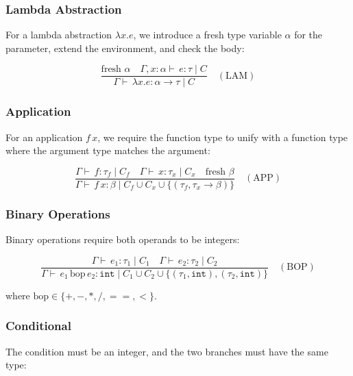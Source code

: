 \documentclass[12pt]{article}
\newcommand{\judge}[1]{\vdash \, #1}
\newcommand{\env}{\Gamma}
\newcommand{\type}{\tau}
\begin{document}
\subsubsection{Lambda Abstraction}

For a lambda abstraction $\lambda x . e$, we introduce a fresh type variable $\alpha$ for the parameter, extend the environment, and check the body:

\begin{equation*}
\frac{
  \text{fresh } \alpha
  \quad
  \env, x : \alpha \judge{e : \type \mid C}
}{
  \env \judge{\lambda x . e : \alpha \to \type \mid C}
}
\quad (\text{LAM})
\end{equation*}

\subsubsection{Application}

For an application $f \, x$, we require the function type to unify with a function type where the argument type matches the argument:

\begin{equation*}
\frac{
  \env \judge{f : \type_f \mid C_f}
  \quad
  \env \judge{x : \type_x \mid C_x}
  \quad
  \text{fresh } \beta
}{
  \env \judge{f \, x : \beta \mid C_f \cup C_x \cup \{(\type_f, \type_x \to \beta)\}}
}
\quad (\text{APP})
\end{equation*}

\subsubsection{Binary Operations}

Binary operations require both operands to be integers:

\begin{equation*}
\frac{
  \env \judge{e_1 : \type_1 \mid C_1}
  \quad
  \env \judge{e_2 : \type_2 \mid C_2}
}{
  \env \judge{e_1 \, \text{bop} \, e_2 : \mathtt{int} \mid C_1 \cup C_2 \cup \{(\type_1, \mathtt{int}), (\type_2, \mathtt{int})\}}
}
\quad (\text{BOP})
\end{equation*}

where $\text{bop} \in \{+, -, *, / , ==, <\}$.

\subsubsection{Conditional}

The condition must be an integer, and the two branches must have the same type:
\end{document}
